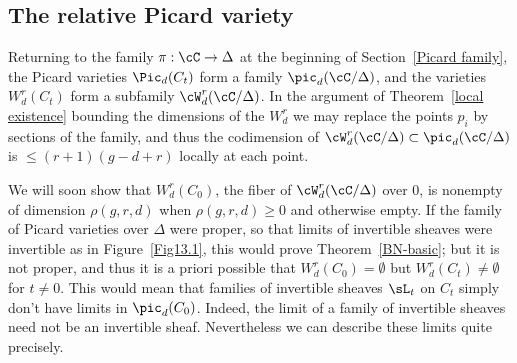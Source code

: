 
\subsection{The relative Picard variety}

Returning to the family $\pi : \cC \to \Delta$ at the beginning of Section~\ref{Picard family}, the Picard varieties $\Pic_d(C_t)$ form a family $\pic_d(\cC/\Delta)$, and the varieties $W^r_d(C_t)$ form a subfamily $\cW^r_d(\cC/\Delta)$.  In the argument
of Theorem~\ref{local existence} bounding  the dimensions of the $W^r_d$
we may replace the points $p_i$ by sections of the family, and thus
the codimension of $\cW^r_d(\cC/\Delta) \subset \pic_d(\cC/\Delta)$ is $\leq (r+1)(g-d+r)$ locally at each point.

We will soon show that $W^{r}_{d}(C_{0})$, the fiber of $\cW^{r}_{d}(\cC/\Delta)$ over 0,  is nonempty of dimension $\rho(g,r,d)$ when $\rho(g,r,d)\geq 0$ and otherwise empty. If the family of Picard varieties over $\Delta$ were proper, so that limits of invertible sheaves were invertible as in Figure~\ref{Fig13.1},
this would prove Theorem~\ref{BN-basic}; but it is not proper, and thus it is a priori possible that $W^{r}_{d}(C_{0})=\emptyset$ but $W^{r}_{d}(C_{t})\neq \emptyset$ for $t\neq 0$. This would mean that families of invertible sheaves $\sL_{t}$ on $C_{t}$  simply don't have  limits
in $\pic_{d}(C_{0})$. Indeed, the limit of a family of invertible sheaves need not be an invertible
sheaf. Nevertheless we can describe these limits quite precisely.



